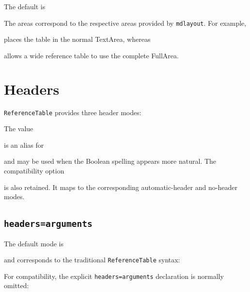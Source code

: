 \documentclass[
11pt,
a4paper,
oneside
]{scrbook}
\begin{document}


The default is




The areas correspond to the respective areas provided by \texttt{mdlayout}.
For example,




places the table in the normal TextArea, whereas




allows a wide reference table to use the complete FullArea.

\section{Headers}

\texttt{ReferenceTable} provides three header modes:




The value




is an alias for




and may be used when the Boolean spelling appears more natural.
The compatibility option




is also retained. It maps to the corresponding automatic-header and
no-header modes.

\subsection{\texttt{headers=arguments}}

The default mode is




and corresponds to the traditional \texttt{ReferenceTable} syntax:




For compatibility, the explicit \texttt{headers=arguments} declaration is
normally omitted:


\end{document}
